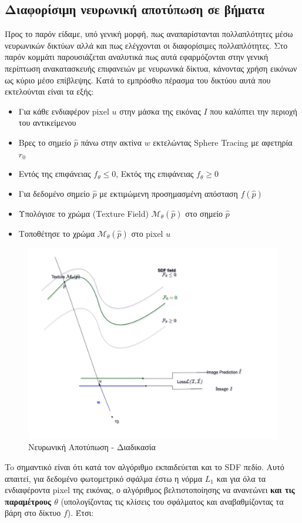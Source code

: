 \subsection{ Διαφορίσιμη νευρωνική αποτύπωση σε  βήματα}
Προς το παρόν είδαμε, υπό γενική μορφή, πως αναπαρίστανται πολλαπλότητες μέσω νευρωνικών δικτύων αλλά και πως ελέγχονται οι διαφορίσιμες πολλαπλότητες. Στο παρόν κομμάτι παρουσιάζεται αναλυτικά πως αυτά εφαρμόζονται στην γενική περίπτωση ανακατασκευής επιφανειών με νευρωνικά δίκτυα, κάνοντας χρήση εικόνων ως κύριο μέσο επίβλεψης.
    Κατά το εμπρόσθιο πέρασμα του δικτύου αυτά που εκτελούνται είναι τα εξής:
    \begin{itemize}
        \item Για κάθε ενδιαφέρον pixel  \(u\) στην μάσκα της εικόνας \({I}\) που καλύπτει την περιοχή του αντικείμενου
        \item Βρες το σημείο \(\hat{p}\) πάνω στην ακτίνα \(w\) εκτελώντας Sphere Tracing με αφετηρία \(r_0\) 
        \item Εντός της επιφάνειας \(f_\theta \leq 0\), Εκτός της επιφάνειας \(f_\theta \geq 0\) 
        \item Για δεδομένο σημείο \(\hat{p}\) με εκτιμώμενη προσημασμένη απόσταση \( f( \hat{p})\)
        \item Υπολόγισε το χρώμα (Τexture Field) \(\mathcal{M_\theta}(\hat{p})\) στο σημείο \(\hat{p}\)
        \item Τοποθέτησε το χρώμα \(\mathcal{M_\theta}(\hat{p})\) στο pixel \(u\) 
    \end{itemize}
    \begin{figure}[ht]
    \centering
    \includegraphics[width=0.6\linewidth]{images/chapter4_img/NeuralRendering.jpg}
    \caption{Νευρωνική Αποτύπωση - Διαδικασία}
    \label{fig:neuralrendering}
    \end{figure}

    
    To σημαντικό είναι ότι κατά τον αλγόριθμο  εκπαιδεύεται και το SDF πεδίο. Αυτό απαιτεί, για δεδομένο φωτομετρικό σφάλμα έστω η νόρμα $L_1$  και για όλα τα ενδιαφέροντα pixel της εικόνας, ο αλγόριθμος βελτιστοποίησης να ανανεώνει \textbf{και τις παραμέτρους $\theta$} (υπολογίζοντας τις κλίσεις του σφάλματος και αναβαθμίζοντας τα βάρη στο δίκτυο $f$). Έτσι:

